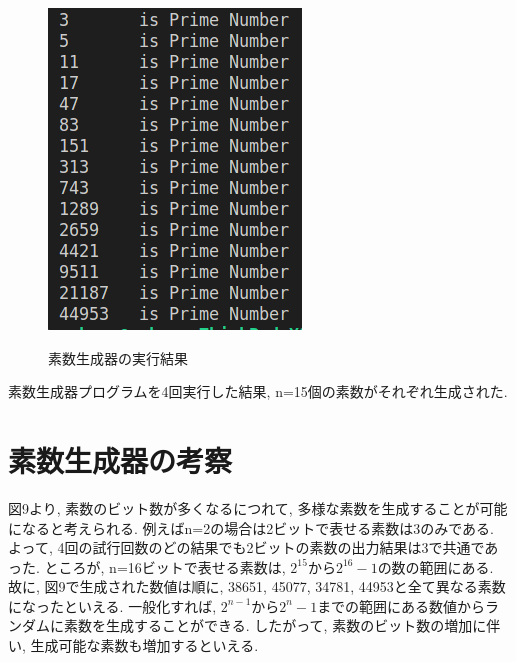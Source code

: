 \documentclass[xelatex, 11pt, a4paper, ja=standard]{bxjsarticle}
\begin{document}
\begin{figure}[htbp]
\begin{minipage}[b]{0.4\textwidth}
        \label{fig:./image/primeGenerator_3.png}
    \end{minipage}
    \hfill
    \begin{minipage}[b]{0.4\textwidth}
        \includegraphics[width=\textwidth]{./image/primeGenerator_4.png}
        \label{fig:./image/primeGenerator_4.png}
    \end{minipage}
    \label{fig:素数生成器の実行結果}
    \caption{素数生成器の実行結果}
\end{figure}
\FloatBarrier %

素数生成器プログラムを4回実行した結果, n=15個の素数がそれぞれ生成された. 

\section{素数生成器の考察}
図9より, 素数のビット数が多くなるにつれて, 多様な素数を生成することが可能になると考えられる. 
例えばn=2の場合は2ビットで表せる素数は3のみである. よって, 4回の試行回数のどの結果でも2ビットの素数の出力結果は3で共通であった. 
ところが, n=16ビットで表せる素数は, $2^15から2^16-1$の数の範囲にある. 
故に, 図9で生成された数値は順に, 38651, 45077, 34781, 44953と全て異なる素数になったといえる. 
一般化すれば, $2^{n-1}から2^n-1$までの範囲にある数値からランダムに素数を生成することができる. 
したがって, 素数のビット数の増加に伴い, 生成可能な素数も増加するといえる. 
\end{document}

